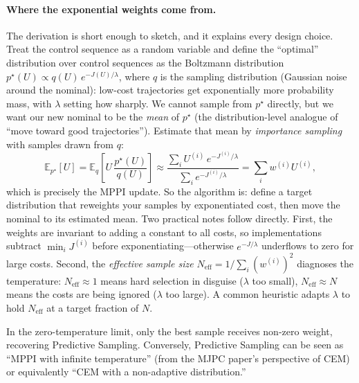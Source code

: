 \documentclass[11pt,twoside]{report}
\theoremstyle{definition}
\theoremstyle{plain}
\theoremstyle{remark}
\newcommand{\0}{\bm{0}}
\begin{document}
\paragraph{Where the exponential weights come from.}
The derivation is short enough to sketch, and it explains every design
choice. Treat the control sequence as a random variable and define the
``optimal'' distribution over control sequences as the Boltzmann
distribution $p^{\star}(U)\propto q(U)\,e^{-J(U)/\lambda}$, where $q$ is
the sampling distribution (Gaussian noise around the nominal):
low-cost trajectories get exponentially more probability mass, with
$\lambda$ setting how sharply.
We cannot sample from $p^{\star}$ directly, but we want our new nominal
to be the \emph{mean} of $p^{\star}$ (the distribution-level analogue of
``move toward good trajectories''). Estimate that mean by
\emph{importance sampling} with samples drawn from $q$:
\begin{equation*}
\mathbb{E}_{p^{\star}}[U]
=\mathbb{E}_{q}\!\left[U\,\frac{p^{\star}(U)}{q(U)}\right]
\approx\frac{\sum_{i}U^{(i)}\,e^{-J^{(i)}/\lambda}}
{\sum_{i}e^{-J^{(i)}/\lambda}}
=\sum_{i}w^{(i)}U^{(i)},
\end{equation*}
which is precisely the MPPI update. So the algorithm is: define a
target distribution that reweights your samples by exponentiated cost,
then move the nominal to its estimated mean. Two practical notes follow
directly. First, the weights are invariant to adding a constant to all
costs, so implementations subtract $\min_{i}J^{(i)}$ before
exponentiating---otherwise $e^{-J/\lambda}$ underflows to zero for
large costs. Second, the \emph{effective sample size}
$N_{\text{eff}}=1/\sum_{i}(w^{(i)})^{2}$ diagnoses the temperature:
$N_{\text{eff}}\approx 1$ means hard selection in disguise
($\lambda$ too small), $N_{\text{eff}}\approx N$ means the costs are
being ignored ($\lambda$ too large). A common heuristic adapts
$\lambda$ to hold $N_{\text{eff}}$ at a target fraction of $N$.

\begin{insightbox}
In the zero-temperature limit, only the best sample receives
non-zero weight, recovering Predictive Sampling.
Conversely, Predictive Sampling can be seen as
``MPPI with infinite temperature'' (from the MJPC paper's
perspective of CEM) or equivalently ``CEM with a non-adaptive
distribution.''
\end{insightbox}
\end{document}
